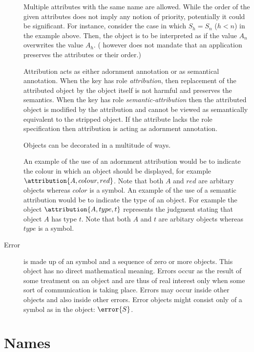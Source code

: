 \begin{description}
Multiple attributes with the same name are allowed.  While the order of the given
attributes does not imply any notion of priority, potentially it could be significant. For
instance, consider the case in which $S_h=S_n$ ($h<n$) in the example above. Then, the
object is to be interpreted as if the value $A_n$ overwrites the value $A_h$.  (\OM
however does not mandate that an application preserves the attributes or their order.)


Attribution acts as either adornment annotation or as semantical annotation. When the key
has role \emph{attribution}, then replacement of the attributed object by the object
itself is not harmful and preserves the semantics. When the key has role
\emph{semantic-attribution} then the attributed object is modified by the attribution and
cannot be viewed as semantically equivalent to the stripped object. If the attribute lacks
the role specification then attribution is acting as adornment annotation.
  
Objects can be decorated in a multitude of ways.

An example of the use of an adornment attribution would be to indicate the colour in which
an \OM object should be displayed, for example $\attribution{A,colour,red}$.  Note that
both $A$ and $red$ are arbitary \OM objects whereas $color$ is a symbol.  An example of
the use of a semantic attribution would be to indicate the type of an object.  For example
the object $\attribution{A,type,t}$ represents the judgment stating that object $A$ has
type $t$. Note that both $A$ and $t$ are arbitary \OM objects whereas $type$ is a symbol.

\item[Error] is made up of an \OM symbol and a sequence of zero or more \OM objects. This
  object has no direct mathematical meaning.  Errors occur as the result of some treatment
  on an \OM object and are thus of real interest only when some sort of communication is
  taking place. Errors may occur inside other objects and also inside other errors.  Error
  objects might consist only of a symbol as in the object: $\error{S}$.
\end{description} 


\section{Names}\label{sec_names}

